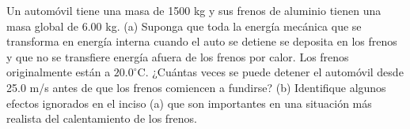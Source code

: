 \item Un automóvil tiene una masa de 1500 kg y sus frenos de aluminio tienen una masa global de 6.00 kg. (a) Suponga que toda la energía mecánica que se transforma en energía interna cuando el auto se detiene se deposita en los frenos y que no se transfiere energía afuera de los frenos por calor. Los frenos originalmente están a $20.0^\circ\text{C}$. ¿Cuántas veces se puede detener el automóvil desde 25.0 m/s antes de que los frenos comiencen a fundirse? (b) Identifique algunos efectos ignorados en el inciso (a) que son importantes en una situación más realista del calentamiento de los frenos.

